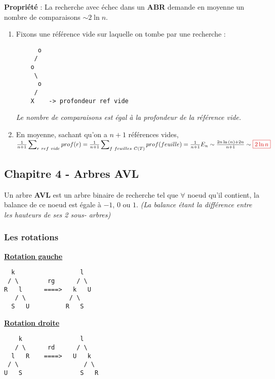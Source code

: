 \documentclass{article}
\newcommand{\red}[1]{\textcolor{darkred}{#1}}
\newcommand{\sumparam}[3]{\sideset{}{_{#1}^{#2}}\sum{#3}}
\newcommand{\stitre}[1]{\noindent\textbf{\underline{#1}} \\}
\begin{document}
\noindent\textbf{Propriété} : La recherche avec échec dans un \textbf{ABR} demande en moyenne un nombre de 
comparaisons $\sim 2\ln n$. \\

\begin{enumerate}
\item Fixons une référence vide sur laquelle on tombe par une recherche : 
\begin{lstlisting}
      o
     /
    o
     \
      o
     /
    X    -> profondeur ref vide
\end{lstlisting}
\noindent \textit{Le nombre de comparaisons est égal à la profondeur de la référence vide.}
\item En moyenne, sachant qu'on a $n+1$ références vides, \\
$\frac{1}{n+1} \sumparam{r\ ref\ vide}{}{prof(r)} \\
= \frac{1}{n+1} \sumparam{f\ feuilles\ C(T)}{}{prof(feuille)} \\
= \frac{1}{n+1} E_n \\
\sim \frac{2n\ln{(n)}+2n}{n+1} \\
\sim \red{\boxed{2 \ln{n}}}$

\end{enumerate}

\subsection{Chapitre 4 - Arbres AVL}

Un arbre \textbf{AVL} est un arbre binaire de recherche tel que $\forall$ noeud qu'il contient, la balance de ce
noeud est égale à $-1$, $0$ ou $1$. \textit{(La balance étant la différence entre les hauteurs de ses 2 sous-
arbres)} \\

\subsubsection{Les rotations}

\stitre{Rotation gauche}

\begin{lstlisting}
  k                  l
 / \        rg      / \
R   l      ====>   k   U
   / \            / \
  S   U          R   S
\end{lstlisting}

\stitre{Rotation droite}

\begin{lstlisting}
    k                l
   / \      rd      / \
  l   R    ====>   U   k
 / \                  / \
U   S                S   R
\end{lstlisting}
\end{document}

